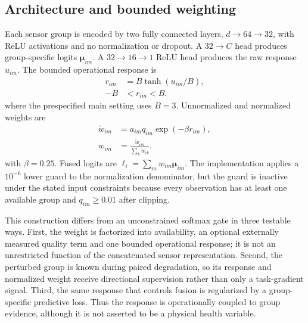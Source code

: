 \documentclass[11pt]{article}
\begin{document}
\subsection{Architecture and bounded weighting}

Each sensor group is encoded by two fully connected layers, $d\rightarrow64\rightarrow32$, with ReLU activations and no normalization or dropout. A $32\rightarrow C$ head produces group-specific logits $\boldsymbol{\mu}_{im}$. A $32\rightarrow16\rightarrow1$ ReLU head produces the raw response $u_{im}$. The bounded operational response is
\begin{equation}
\begin{aligned}
r_{im}&=B\tanh(u_{im}/B),\\
-B&<r_{im}<B.
\end{aligned}
\label{eq:score}
\end{equation}
where the prespecified main setting uses $B=3$. Unnormalized and normalized weights are
\begin{equation}
\begin{aligned}
\widetilde w_{im}&=a_{im}q_{im}\exp(-\beta r_{im}),\\
 w_{im}&=\frac{\widetilde w_{im}}{\sum_k\widetilde w_{ik}}.
\end{aligned}
\label{eq:weights}
\end{equation}
with $\beta=0.25$. Fused logits are $\boldsymbol{\ell}_i=\sum_mw_{im}\boldsymbol{\mu}_{im}$. The implementation applies a $10^{-6}$ lower guard to the normalization denominator, but the guard is inactive under the stated input constraints because every observation has at least one available group and $q_{im}\geq0.01$ after clipping.

This construction differs from an unconstrained softmax gate in three testable ways. First, the weight is factorized into availability, an optional externally measured quality term and one bounded operational response; it is not an unrestricted function of the concatenated sensor representation. Second, the perturbed group is known during paired degradation, so its response and normalized weight receive directional supervision rather than only a task-gradient signal. Third, the same response that controls fusion is regularized by a group-specific predictive loss. Thus the response is operationally coupled to group evidence, although it is not asserted to be a physical health variable.
\end{document}
